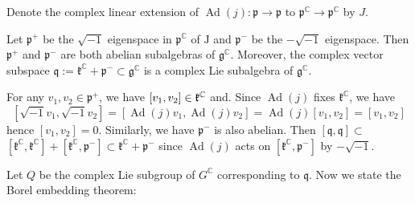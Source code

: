 Denote the complex linear extension of $\operatorname{Ad}(j):
\mathfrak{p} \rightarrow \mathfrak{p}$ to
$\mathfrak{p}^{\mathbb{C}} \rightarrow \mathfrak{p}^{\mathbb{C}}$
by $J$.
\begin{lemma}
	Let $\mathfrak{p}^{+}$ be the $\sqrt{-1}$ eigenspace in
	$\mathfrak{p}^{\mathbb{C}}$ of $\mathrm{J}$ and
	$\mathfrak{p}^{-}$ be the $-\sqrt{-1}$ eigenspace. Then
	$\mathfrak{p}^{+}$ and $\mathfrak{p}^{-}$ are both abelian
	subalgebras of $\mathfrak{g}^{\mathbb{C}}$. Moreover, the
	complex vector subspace
	$\mathfrak{q}:=\mathfrak{k}^{\mathbb{C}}+\mathfrak{p}^{-}
	\subset \mathfrak{g}^{\mathbb{C}}$ is a complex Lie
	subalgebra of $\mathfrak{g}^{\mathbb{C}}$.
\end{lemma}
\bproof

For any $v_{1}, v_{2} \in \mathfrak{p}^{+}$, we have
$\left[v_{1}, v_{2}\right] \in {\mathfrak k}^{\mathbb{C}}$ and. Since
$\operatorname{Ad}(j)$ fixes $\mathfrak{k}^{\mathbb{C}}$, we have
\[
\left[\sqrt{-1} v_{1}, \sqrt{-1}
v_{2}\right]=\left[\operatorname{Ad}(j) v_{1},
\operatorname{Ad}(j)
v_{2}\right]=\operatorname{Ad}(j)\left[v_{1},
v_{2}\right]=\left[v_{1}, v_{2}\right]
\]
hence $\left[v_{1}, v_{2}\right]=0 .$ Similarly, we have
$\mathfrak{p}^{-}$ is also abelian. Then $[\mathfrak q, \mathfrak
q] \subset$ $\left[\mathfrak{k}^{\mathbb{C}},
\mathfrak{k}^{\mathbb{C}}\right]+\left[\mathfrak{k}^{\mathbb{C}},
\mathfrak{p}^{-}\right] \subset
\mathfrak{k}^{\mathbb{C}}+\mathfrak{p}^{-}$ since
$\operatorname{Ad}(j)$ acts on $\left[\mathfrak{k}^{\mathbb{C}},
\mathfrak{p}^{-}\right]$ by $-\sqrt{-1}$.
\eproof



Let $Q$ be the complex Lie subgroup of $G^{\mathbb{C}}$
corresponding to $\mathfrak{q}$. Now we state  the Borel
embedding theorem:

